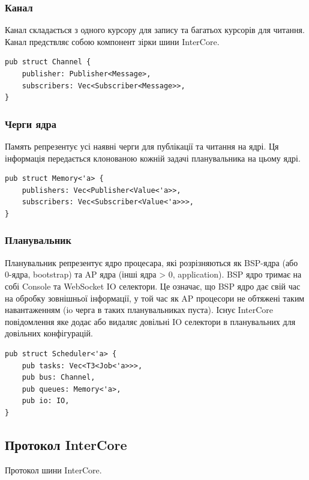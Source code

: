 \paragraph{}
\subsubsection{Канал}
Канал складається з одного курсору для запису та багатьох курсорів для читання.
Канал предствляє собою компонент зірки шини InterCore.
\begin{lstlisting}
pub struct Channel {
    publisher: Publisher<Message>,
    subscribers: Vec<Subscriber<Message>>,
}
\end{lstlisting}

\subsubsection{Черги ядра}
Память репрезентує усі наявні черги для публікації та читання на ядрі.
Ця інформація передається клонованою кожній задачі планувальника на цьому ядрі.
\begin{lstlisting}
pub struct Memory<'a> {
    publishers: Vec<Publisher<Value<'a>>,
    subscribers: Vec<Subscriber<Value<'a>>>,
}
\end{lstlisting}

\subsubsection{Планувальник}
Планувальник репрезентує ядро процесара,
які розрізняються як BSP-ядра (або 0-ядра, bootstrap)
та AP ядра (інші ядра > 0, application). BSP ядро
тримає на собі Console та WebSocket IO селектори.
Це означає, що BSP ядро дає свій час на обробку зовнішньої інформації,
у той час як AP процесори не обтяжені
таким навантаженням (io черга в таких планувальниках пуста).
Існує InterCore повідомлення яке додає або видаляє довільні IO селектори
в планувальних для довільних конфігурацій.

\begin{lstlisting}
pub struct Scheduler<'a> {
    pub tasks: Vec<T3<Job<'a>>>,
    pub bus: Channel,
    pub queues: Memory<'a>,
    pub io: IO,
}
\end{lstlisting}

\subsection{Протокол InterCore}

Протокол шини InterCore.

